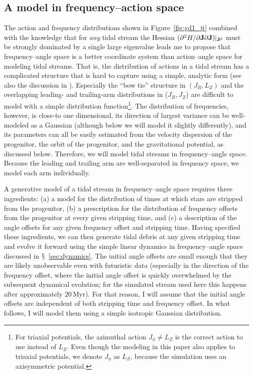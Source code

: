 \documentclass{emulateapj}
\renewcommand{\figurename}{Figure}
\newcommand{\sectionname}{$\mathsection$}
\renewcommand{\vec}[1]{\ensuremath{\mathbf{#1}}}
\newcommand{\vecj}{\ensuremath{\vec{J}}}
\newcommand{\Myr}{\ensuremath{\,\mathrm{Myr}}}
\begin{document}
\subsection{A model in frequency--action space}\label{sec:modeloa}

The action and frequency distributions shown in
\figurename~\ref{fig:gd1_jt} combined with the knowledge that for
\emph{any} tidal stream the Hessian $(\partial^2 H / \partial \vecj
\partial \vecj)\large|_{\vecj^p}$ must be strongly dominated by a
single large eigenvalue leads me to propose that frequency--angle
space is a better coordinate system than action--angle space for
modeling tidal streams. That is, the distribution of actions in a
tidal stream has a complicated structure that is hard to capture using
a simple, analytic form (see also the discussion in
\citealt{Eyre11a}). Especially the ``bow tie'' structure in
$(J_R,L_Z)$ and the overlapping leading- and trailing-arm
distributions in ($J_R,J_Z$) are difficult to model with a simple
distribution function\footnote{For triaxial potentials, the azimuthal
  action $J_\phi \neq L_Z$ is the correct action to use instead of
  $L_Z$. Even though the modeling in this paper also applies to
  triaxial potentials, we denote $J_\phi$ as $L_Z$, because the
  simulation uses an axisymmetric potential.}. The distribution of
frequencies, however, is close-to one dimensional, its direction of
largest variance can be well-modeled as a Gaussian (although below we
will model it slightly differently), and its parameters can all be
easily estimated from the velocity dispersion of the progenitor, the
orbit of the progenitor, and the gravitational potential, as discussed
below. Therefore, we will model tidal streams in frequency--angle
space. Because the leading and trailing arm are well-separated in
frequency space, we model each arm individually.

A generative model of a tidal stream in frequency--angle space
requires three ingredients: (a) a model for the distribution of times
at which stars are stripped from the progenitor, (b) a prescription
for the distribution of frequency offsets from the progenitor at every
given stripping time, and (c) a description of the angle offsets for
any given frequency offset and stripping time. Having specified these
ingredients, we can then generate tidal debris at any given stripping
time and evolve it forward using the simple linear dynamics in
frequency--angle space discussed in
\sectionname~\ref{sec:dynamics}. The initial angle offsets are small
enough that they are likely unobservable even with futuristic data
(especially in the direction of the frequency offset, where the
initial angle offset is quickly overwhelmed by the subsequent
dynamical evolution; for the simulated stream used here this happens
after approximately $20\Myr$). For that reason, I will assume that the
initial angle offsets are independent of both stripping time and
frequency offset. In what follows, I will model them using a simple
isotropic Gaussian distribution.
\end{document}

